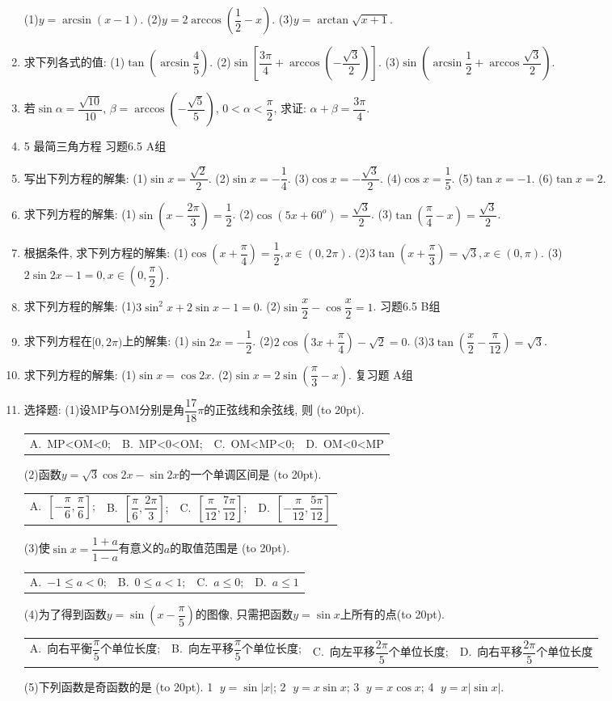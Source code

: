 \documentclass[10pt,a4paper]{article}
\newcommand{\bracket}[1]{(\hbox to #1pt{})}
\newcommand{\fourch}[4]{\par\begin{tabular}{p{.23\textwidth}p{.23\textwidth}p{.23\textwidth}p{.23\textwidth}}
A.~#1 &B.~#2& C.~#3& D.~#4
\end{tabular}}
\begin{document}
\begin{enumerate}[1.]
(1)$y=\arcsin (x-1)$.						(2)$y=2\arccos (\dfrac 12-x)$.
(3)$y=\arctan \sqrt {x+1}$.
\item 求下列各式的值:
(1)$\tan (\arcsin \dfrac 45)$.							(2)$\sin [\dfrac{3\pi }4+\arccos (-\dfrac{\sqrt 3}2)]$.
(3)$\sin (\arcsin \dfrac 12+\arccos \dfrac{\sqrt 3}2)$.
\item 若$\sin \alpha =\dfrac{\sqrt {10}}{10}$, $\beta =\arccos (-\dfrac{\sqrt 5}5)$, $0<\alpha <\dfrac{\pi }2$, 求证: $\alpha +\beta =\dfrac{3\pi }4$.
\item 5  最简三角方程
习题6.5  A组
\item 写出下列方程的解集:
(1)$\sin x=\dfrac{\sqrt 2}2$.								(2)$\sin x=-\dfrac 14$.
(3)$\cos x=-\dfrac{\sqrt 3}2$.							(4)$\cos x=\dfrac 15$.
(5)$\tan x=-1$.								(6)$\tan x=2$.
\item 求下列方程的解集:
(1)$\sin (x-\dfrac{2\pi }3)=\dfrac 12$.						(2)$\cos (5x+60^o)=\dfrac{\sqrt 3}2$.
(3)$\tan (\dfrac{\pi }4-x)=\dfrac{\sqrt 3}2$.
\item 根据条件, 求下列方程的解集:
(1)$\cos (x+\dfrac{\pi }4)=\dfrac 12,x\in (0,2\pi)$.
(2)$3\tan (x+\dfrac{\pi }3)=\sqrt 3,x\in (0,\pi)$.
(3)$2\sin 2x-1=0,x\in (0,\dfrac{\pi }2)$.
\item 求下列方程的解集:
(1)$3\sin ^2x+2\sin x-1=0$.
(2)$\sin \dfrac x2-\cos \dfrac x2=1$.
习题6.5  B组
\item 求下列方程在$[0,2\pi)$上的解集:
(1)$\sin 2x=-\dfrac 12$.						(2)$2\cos (3x+\dfrac{\pi }4)-\sqrt 2=0$.
(3)$3\tan (\dfrac x2-\dfrac{\pi }{12})=\sqrt 3$.
\item 求下列方程的解集:
(1)$\sin x=\cos 2x$.						(2)$\sin x=2\sin (\dfrac{\pi }3-x)$.
复习题
A组
\item 选择题:
(1)设MP与OM分别是角$\dfrac{17}{18}\pi$的正弦线和余弦线, 则						\bracket{20}.
\fourch{MP<OM<0;}{MP<0<OM;}{OM<MP<0;}{OM<0<MP}
(2)函数$y=\sqrt 3\cos 2x-\sin 2x$的一个单调区间是						\bracket{20}.
\fourch{$[-\dfrac{\pi }6,\dfrac{\pi }6]$;}{$[\dfrac{\pi }6,\dfrac{2\pi }3]$;}{$[\dfrac{\pi }{12},\dfrac{7\pi }{12}]$;}{$[-\dfrac{\pi }{12},\dfrac{5\pi }{12}]$}
(3)使$\sin x=\dfrac{1+a}{1-a}$有意义的$a$的取值范围是							\bracket{20}.
\fourch{$-1\le a<0$;}{$0\le a<1$;}{$a\le 0$;}{$a\le 1$}
(4)为了得到函数$y=\sin (x-\dfrac{\pi }5)$的图像, 只需把函数$y=\sin x$上所有的点\bracket{20}.
\fourch{向右平衡$\dfrac{\pi }5$个单位长度;}{向左平移$\dfrac{\pi }5$个单位长度;}{向左平移$\dfrac{2\pi }5$个单位长度;}{向右平移$\dfrac{2\pi }5$个单位长度}
(5)下列函数是奇函数的是											\bracket{20}.
\textcircled{1} $y=\sin|x|$; \textcircled{2} $y=x\sin x$; \textcircled{3} $y=x\cos x$;  \textcircled{4} $y=x|\sin x|$.

\end{enumerate}
\end{document}
